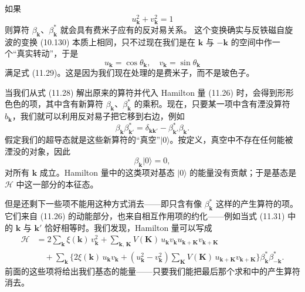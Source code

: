 如果
\begin{equation*}
u^{2}_{\mathbf{k}}+v^{2}_{\mathbf{k}}=1
\tag{11.29}
\end{equation*}
则算符 $\beta_{\mathbf{k}}$、$\beta^{*}_{\mathbf{k}}$ 就会具有费米子应有的反对易关系。
这个变换确实与反铁磁自旋波的变换 (10.130) 本质上相同，只不过现在我们是在 $\mathbf{k}$ 与 $-\mathbf{k}$ 的空间中作一个“真实转动”，于是
\begin{equation*}
u_{\mathbf{k}}=\cos\theta_{\mathbf{k}},\quad v_{\mathbf{k}}=\sin\theta_{\mathbf{k}}
\tag{11.30}
\end{equation*}
满足式 (11.29)。这是因为我们现在处理的是费米子，而不是玻色子。

当我们从式 (11.28) 解出原来的算符并代入 Hamilton 量 (11.26) 时，会得到形形色色的项，其中含有新算符 $\beta_{\mathbf{k}}$、$\beta^{*}_{\mathbf{k}}$ 的乘积。现在，只要某一项中含有湮没算符 $b_{\mathbf{k}}$，我们就可以利用反对易子把它移到右边，例如
\begin{equation*}
\beta_{\mathbf{k}}\beta^{*}_{\mathbf{k}'}=\delta_{\mathbf{k}\mathbf{k}'}-\beta^{*}_{\mathbf{k}'}\beta_{\mathbf{k}}.
\tag{11.31}
\end{equation*}
假定我们的超导态就是这些新算符的“真空”$|0\rangle$。按定义，真空中不存在任何能被湮没的对象，因此
\begin{equation*}
\beta_{\mathbf{k}}|0\rangle=0,
\tag{11.32}
\end{equation*}
对所有 $\mathbf{k}$ 成立。Hamilton 量中的这类项对基态 $|0\rangle$ 的能量没有贡献；于是基态是 $\mathcal{H}$ 中这一部分的本征态。

但是还剩下一些项不能用这种方式消去——即只含有像 $\beta^{*}_{\mathbf{k}}$ 这样的产生算符的项。它们来自 (11.26) 的动能部分，也来自相互作用项的约化——例如当式 (11.31) 中的 $\mathbf{k}$ 与 $\mathbf{k}'$ 恰好相等时。我们发现，Hamilton 量可以写成
\begin{align*}
\mathcal{H}&=2\sum_{\mathbf{k}}\xi(\mathbf{k})\,v^{2}_{\mathbf{k}}+\sum_{\mathbf{k},\,\mathbf{K}}V(\mathbf{K})\,u_{\mathbf{k}}v_{\mathbf{k}}u_{\mathbf{k}+\mathbf{K}}v_{\mathbf{k}+\mathbf{K}}\\
&\quad+\sum_{\mathbf{k}}\bigl\{2\xi(\mathbf{k})\,u_{\mathbf{k}}v_{\mathbf{k}}+(u^{2}_{\mathbf{k}}-v^{2}_{\mathbf{k}})\sum_{\mathbf{K}}V(\mathbf{K})\,u_{\mathbf{k}+\mathbf{K}}v_{\mathbf{k}+\mathbf{K}}\bigr\}\beta^{*}_{\mathbf{k}}\beta^{*}_{-\mathbf{k}}.
\tag{11.33}
\end{align*}
前面的这些项将给出我们基态的能量——只要我们能把最后那个求和中的产生算符消去。

